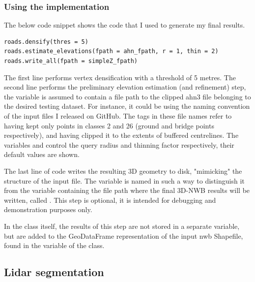 \subsubsection{Using the implementation}

The below code snippet shows the code that I used to generate my final results.

\begin{verbatim}
roads.densify(thres = 5)
roads.estimate_elevations(fpath = ahn_fpath, r = 1, thin = 2)
roads.write_all(fpath = simpleZ_fpath)
\end{verbatim}

The first line performs vertex densification with a threshold of 5 metres. The second line performs the preliminary elevation estimation (and refinement) step, the variable  is assumed to contain a file path to the clipped \ac{ahn3} file belonging to the desired testing dataset. For instance, it could be  using the naming convention of the input files I released on GitHub. The tags  in these file names refer to having kept only points in classes 2 and 26 (ground and bridge points respectively), and having clipped it to the extents of buffered centrelines. The variables  and  control the query radius and thinning factor respectively, their default values are shown.

The last line of code writes the resulting 3D geometry to disk, "mimicking" the structure of the input file. The variable is named in such a way to distinguish it from the variable containing the file path where the final 3D-NWB results will be written, called . This step is optional, it is intended for debugging and demonstration purposes only.

In the class itself, the results of this step are not stored in a separate variable, but are added to the GeoDataFrame representation of the input \ac{nwb} Shapefile, found in the  variable of the  class.

\subsection{Lidar segmentation}
\label{sub:r_lidarsegmentation}

